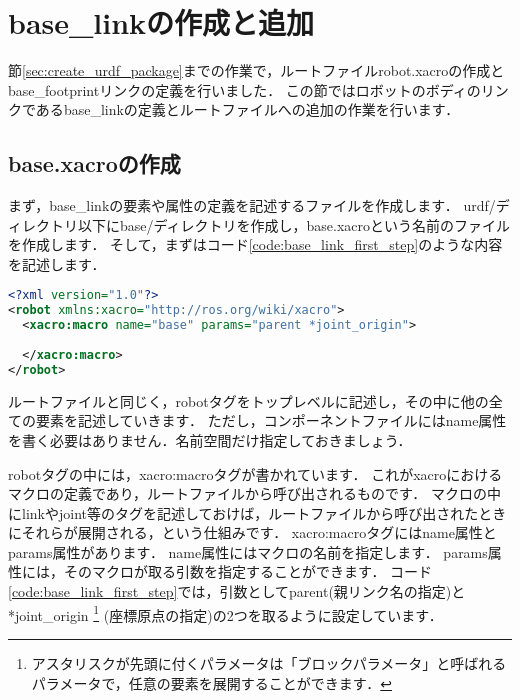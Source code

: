 \documentclass[{../../master}]{subfiles}
\begin{document}
\section{\textsf{base\_link}の作成と追加}

節\ref{sec:create_urdf_package}までの作業で，ルートファイル\textsf{robot.xacro}の作成と\textsf{base\_footprint}リンクの定義を行いました．
この節ではロボットのボディのリンクである\textsf{base\_link}の定義とルートファイルへの追加の作業を行います．

\subsection{\textsf{base.xacro}の作成}

まず，\textsf{base\_link}の要素や属性の定義を記述するファイルを作成します．
\textsf{urdf/}ディレクトリ以下に\textsf{base/}ディレクトリを作成し，\textsf{base.xacro}という名前のファイルを作成します．
そして，まずはコード\ref{code:base_link_first_step}のような内容を記述します．

\begin{lstlisting}[language=XML, caption=\textsf{base.xacro}, label=code:base_link_first_step]
<?xml version="1.0"?>
<robot xmlns:xacro="http://ros.org/wiki/xacro">
  <xacro:macro name="base" params="parent *joint_origin">
    
  </xacro:macro>
</robot>
\end{lstlisting}

ルートファイルと同じく，\textsf{robot}タグをトップレベルに記述し，その中に他の全ての要素を記述していきます．
ただし，コンポーネントファイルには\textsf{name}属性を書く必要はありません．名前空間だけ指定しておきましょう．

\textsf{robot}タグの中には，\textsf{xacro:macro}タグが書かれています．
これが\textsf{xacro}におけるマクロの定義であり，ルートファイルから呼び出されるものです．
マクロの中に\textsf{link}や\textsf{joint}等のタグを記述しておけば，ルートファイルから呼び出されたときにそれらが展開される，という仕組みです．
\textsf{xacro:macro}タグには\textsf{name}属性と\textsf{params}属性があります．
\textsf{name}属性にはマクロの名前を指定します．
\textsf{params}属性には，そのマクロが取る引数を指定することができます．
コード\ref{code:base_link_first_step}では，引数として\textsf{parent}(親リンク名の指定)と\textsf{*joint\_origin}
\footnote{アスタリスクが先頭に付くパラメータは「ブロックパラメータ」と呼ばれるパラメータで，任意の要素を展開することができます．}
(座標原点の指定)の2つを取るように設定しています．
\end{document}
